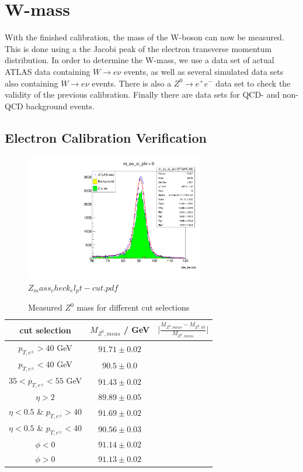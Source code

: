 \section{W-mass}
\label{sec:w-mass}
With the finished calibration, the mass of the W-boson can now be measured. This is done using a the Jacobi peak of the electron transverse momentum distribution.
In order to determine the W-mass, we use a data set of actual ATLAS data containing $W \rightarrow e\nu$ events,
as well as several simulated data sets also containing $W \rightarrow e\nu$ events. 
There is also a $Z^0 \rightarrow e^+e^-$ data set to check the validity of the previous calibration.
Finally there are data sets for QCD- and non-QCD background events.

\subsection{Electron Calibration Verification}

\begin{figure}[H]
    \centering
    \includegraphics[width=0.7\textwidth]{../W_mass/Z_mass_check_phi_positive.pdf}
    \caption{$Z_mass_check_el_pt-cut.pdf$}
    \label{fig:z-mass_check}
\end{figure}

\begin{table}[H]
    \centering
    \begin{tabular}{ccc}
        \toprule
        \toprule
        cut selection & $M_{Z^0,meas}$ / GeV & $\bigl| \frac{M_{Z^0,meas}- M_{Z^0,lit}}{M_{Z^0,meas}} \bigr|$ \\
        \midrule
        $p_{T,e^{\pm}} > 40$ GeV & $91.71 \pm 0.02$ & \\
        $p_{T,e^{\pm}} < 40$ GeV & $90.5 \pm 0.0$ & \\
        $35 < p_{T,e^{\pm}} < 55$ GeV & $91.43 \pm 0.02$ & \\
        $\eta > 2$ & $89.89 \pm 0.05$ & \\
        $\eta < 0.5$ \& $p_{T,e^{\pm}} > 40$ & $91.69 \pm 0.02$ & \\
        $\eta < 0.5$ \& $p_{T,e^{\pm}} < 40$ & $90.56 \pm 0.03$ & \\
        $\phi < 0$ & $91.14 \pm 0.02$ & \\
        $\phi > 0$ & $91.13 \pm 0.02$ & \\
        \bottomrule
        \bottomrule
    \end{tabular}
    \caption{Measured $Z^0$ mass for different cut selections}
    \label{tab:z-masses}
\end{table}


